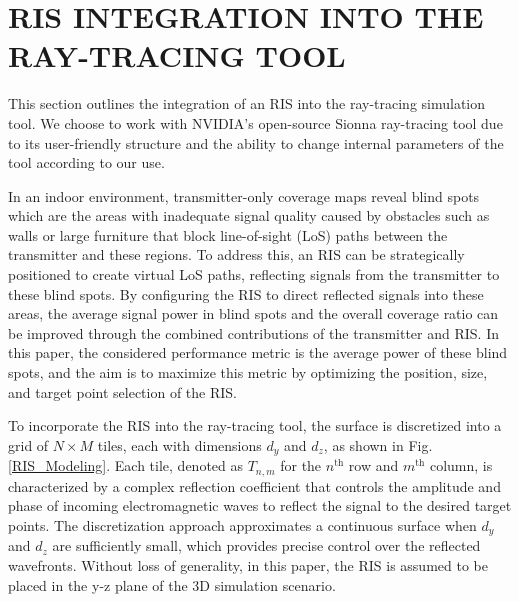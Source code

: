 \documentclass{IEEEoj}
\begin{document}
\section{RIS INTEGRATION INTO THE RAY-TRACING TOOL} \label{sec:ris_integration_into_RT}
This section outlines the integration of an RIS into the ray-tracing simulation tool. We choose to work with NVIDIA's open-source Sionna ray-tracing tool \cite{sionna} due to its user-friendly structure and the ability to change internal parameters of the tool according to our use.

In an indoor environment, transmitter-only coverage maps reveal blind spots which are the areas with inadequate signal quality caused by obstacles such as walls or large furniture that block line-of-sight (LoS) paths between the transmitter and these regions. To address this, an RIS can be strategically positioned to create virtual LoS paths, reflecting signals from the transmitter to these blind spots. By configuring the RIS to direct reflected signals into these areas, the average signal power in blind spots and the overall coverage ratio can be improved through the combined contributions of the transmitter and RIS. In this paper, the considered performance metric is the average power of these blind spots, and the aim is to maximize this metric by optimizing the position, size, and target point selection of the RIS.

To incorporate the RIS into the ray-tracing tool, the surface is discretized into a grid of $N \times M$ tiles, each with dimensions $d_y$ and $d_z$, as shown in Fig. \ref{RIS_Modeling}. Each tile, denoted as $T_{n,m}$ for the $n^{\text{th}}$ row and $m^{\text{th}}$ column, is characterized by a complex reflection coefficient that controls the amplitude and phase of incoming electromagnetic waves to reflect the signal to the desired target points. The discretization approach approximates a continuous surface when $d_y$ and $d_z$ are sufficiently small, which provides precise control over the reflected wavefronts. Without loss of generality, in this paper, the RIS is assumed to be placed in the y-z plane of the 3D simulation scenario.
\end{document}
